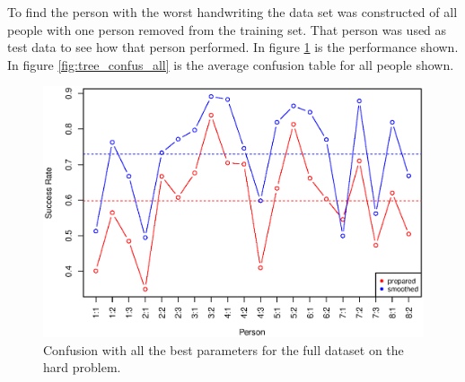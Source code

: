 To find the person with the worst handwriting the data set was constructed of all people with one person removed from the training set.
That person was used as test data to see how that person performed.
In figure \ref{fig:tree_performance_all} is the performance shown.
In figure \ref{fig:tree_confus_all} is the average confusion table for all people shown.

\begin{figure}[H]
\centering
\includegraphics[width=\textwidth]{graphics/tree_performance_all_combined}
\caption{Confusion with all the best parameters for the full dataset on the hard problem.}
\label{fig:tree_performance_all}
\end{figure}


